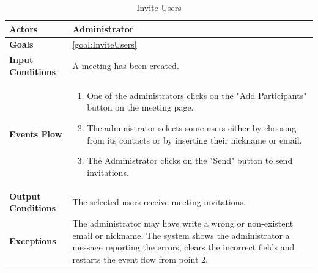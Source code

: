 \begin{table}[H]
	\centering
	\def\arraystretch{1.5}
	\begin{tabular}{|p{7cm}|p{7cm}|}
		\hline
		\textbf{Actors}            & Administrator    \\ \hline
		\textbf{Goals}             & \ref{goal:InviteUsers}           \\ \hline
		\textbf{Input Conditions}  & A meeting has been created.           \\ \hline
		\textbf{Events Flow}       &  
		\begin{enumerate}[topsep=0pt, leftmargin=*]
			\item One of the administrators clicks on the "Add Participants" button on the meeting page.
			\item The administrator selects some users either by choosing from its contacts or by inserting their nickname or email.
			\item The Administrator clicks on the "Send" button to send invitations.
		\end{enumerate}           \\ \hline
		\textbf{Output Conditions} & The selected users receive meeting invitations.            \\ \hline
		\textbf{Exceptions}        & 
		The administrator may have write a wrong or non-existent email or nickname. The system shows the administrator a message reporting the errors, clears the incorrect fields and restarts the event flow from point 2.     \\ \hline
	\end{tabular}
	\caption{Invite Users\label{UseCaseDescr:InviteUsers}}
\end{table}

